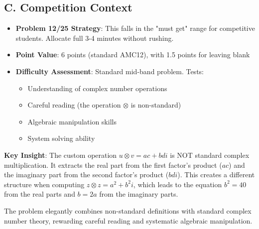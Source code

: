 \documentclass[12pt]{article}
\begin{document}
\begin{competitionbox}
\subsection*{C. Competition Context}
\begin{itemize}[leftmargin=*]
    \item \textbf{Problem 12/25 Strategy}: This falls in the "must get" range for competitive students. Allocate full 3-4 minutes without rushing.
    \item \textbf{Point Value}: 6 points (standard AMC12), with 1.5 points for leaving blank
    \item \textbf{Difficulty Assessment}: Standard mid-band problem. Tests:
    \begin{itemize}
        \item Understanding of complex number operations
        \item Careful reading (the operation $\otimes$ is non-standard)
        \item Algebraic manipulation skills
        \item System solving ability
    \end{itemize}
\end{itemize}
\end{competitionbox}

\begin{keyinsightbox}
\textbf{Key Insight}: The custom operation $u \otimes v = ac + bdi$ is NOT standard complex multiplication. It extracts the real part from the first factor's product ($ac$) and the imaginary part from the second factor's product ($bdi$). This creates a different structure when computing $z \otimes z = a^2 + b^2i$, which leads to the equation $b^2 = 40$ from the real parts and $b = 2a$ from the imaginary parts.

The problem elegantly combines non-standard definitions with standard complex number theory, rewarding careful reading and systematic algebraic manipulation.
\end{keyinsightbox}
\end{document}
